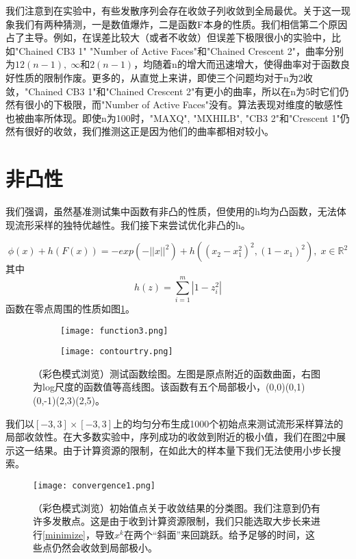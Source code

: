 \documentclass[macfonts]{njuthesis}
\begin{document}
我们注意到在实验中，有些发散序列会存在收敛子列收敛到全局最优。关于这一现象我们有两种猜测，一是数值爆炸，二是函数F本身的性质。我们相信第二个原因占了主导。例如，在误差比较大（或者不收敛）但误差下极限很小的实验中，比如"Chained CB3 1" "Number of Active Faces"和"Chained Crescent 2"，曲率分别为$12(n-1),\;\infty$和$2(n-1)$，均随着n的增大而迅速增大，使得曲率对于函数良好性质的限制作废。更多的，从直觉上来讲，即使三个问题均对于n为2收敛，"Chained CB3 1"和"Chained Crescent 2"有更小的曲率，所以在n为5时它们仍然有很小的下极限，而"Number of Active Faces"没有。算法表现对维度的敏感性也被曲率所体现。即使n为100时，"MAXQ", "MXHILB", "CB3 2"和"Crescent 1"仍然有很好的收敛，我们推测这正是因为他们的曲率都相对较小。

\section{非凸性}
我们强调，虽然基准测试集中函数有非凸的性质，但使用的h均为凸函数，无法体现流形采样的独特优越性。我们接下来尝试优化非凸的h。

\begin{equation}
\label{testfunc3}
\phi(x)+h(F(x))=-exp(-||x||^2)+h((x_2-x_1^2)^2,(1-x_1)^2), \;x\in \mathbb{R}^2
\end{equation}
其中
$$
h(z)=\sum_{i=1}^m |1-z_i^2|
$$
函数在零点周围的性质如图\ref{fig:function3}。


    \begin{figure}[ht!]
    \centering
    \begin{subfigure}{.45\textwidth}
    	\centering
        \texttt{[image: function3.png]}
    \end{subfigure}
    \begin{subfigure}{.45\textwidth}
    	\centering
        \texttt{[image: contourtry.png]}
    \end{subfigure}
    \caption{（彩色模式浏览）测试函数绘图。左图是原点附近的函数曲面，右图为log尺度的函数值等高线图。该函数有五个局部极小，(0,0)(0,1)(0,-1)(2,3)(2,5)。}
\label{fig:function3}
\end{figure}

我们以$[-3,3]\times [-3,3]$上的均匀分布生成1000个初始点来测试流形采样算法的局部收敛性。在大多数实验中，序列成功的收敛到附近的极小值，我们在图\ref{fig:convergence}中展示这一结果。由于计算资源的限制，在如此大的样本量下我们无法使用小步长搜索。 
  
  \begin{figure}[H]
\centering

  \texttt{[image: convergence1.png]}

   \caption{（彩色模式浏览）初始值点关于收敛结果的分类图。我们注意到仍有许多发散点。这是由于收到计算资源限制，我们只能选取大步长来进行\ref{minimize}，导致$x^k$在两个“斜面”来回跳跃。给予足够的时间，这些点仍然会收敛到局部极小。}
\label{fig:convergence}
  \end{figure}
  
\end{document}
